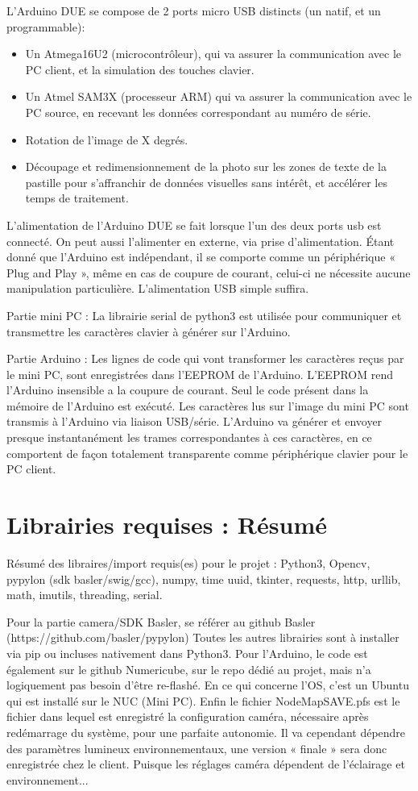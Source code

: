 L’Arduino DUE se compose de 2 ports micro USB distincts (un natif, et un programmable):
\begin{itemize}
    \item Un Atmega16U2 (microcontrôleur), qui va assurer la communication avec le PC client, et la simulation des touches clavier.
    \item Un Atmel SAM3X (processeur ARM) qui va assurer la communication avec le PC source, en recevant les données correspondant au numéro de série.
    \item Rotation de l'image de X degrés.
    \item Découpage et redimensionnement de la photo sur les zones de texte de la pastille pour s’affranchir de données visuelles sans intérêt, et accélérer les temps de traitement.
\end{itemize}

L’alimentation de l’Arduino DUE se fait lorsque l’un des deux ports usb est connecté. On peut aussi l’alimenter en externe, via prise d’alimentation. Étant donné que l’Arduino est indépendant, il se comporte comme un périphérique « Plug and Play », même en cas de coupure de courant, celui-ci ne nécessite aucune manipulation particulière. L’alimentation USB simple suffira.

Partie mini PC : La librairie serial de python3 est utilisée pour communiquer et transmettre les caractères clavier à générer sur l’Arduino.

Partie Arduino : Les lignes de code qui vont transformer les caractères reçus par le mini PC, sont enregistrées dans l’EEPROM de l’Arduino. L’EEPROM rend l’Arduino insensible a la coupure de courant. Seul le code présent dans la mémoire de l’Arduino est exécuté.
Les caractères lus sur l’image du mini PC sont transmis à l’Arduino via liaison USB/série. L’Arduino va générer et envoyer presque instantanément les trames correspondantes à ces caractères, en ce comportent de façon totalement transparente comme périphérique clavier pour le PC client.

\section{Librairies requises : Résumé}

Résumé des libraires/import requis(es) pour le projet :
Python3, Opencv, pypylon (sdk basler/swig/gcc), numpy, time uuid, tkinter, requests, http, urllib, math, imutils, threading, serial.

Pour la partie camera/SDK Basler, se référer au github Basler (https://github.com/basler/pypylon)
Toutes les autres librairies sont à installer via pip ou incluses nativement dans Python3.
Pour l’Arduino, le code est également sur le github Numericube, sur le repo dédié au projet, mais n’a logiquement pas besoin d’être re-flashé.
En ce qui concerne l’OS, c’est un Ubuntu qui est installé sur le NUC (Mini PC).
Enfin le fichier NodeMapSAVE.pfs est le fichier dans lequel est enregistré la configuration caméra, nécessaire après redémarrage du système, pour une parfaite autonomie. Il va cependant dépendre des paramètres lumineux environnementaux, une version « finale » sera donc enregistrée chez le client. Puisque les réglages caméra dépendent de l’éclairage et environnement...

